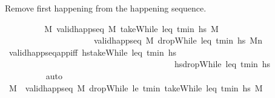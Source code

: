 \begin{isabellebody}
\begin{isamarkuptext}%
Remove first happening from the happening sequence.%
\end{isamarkuptext}\isamarkuptrue%
\ \ \ \ \ \ \isamarkupfalse%
\ \isamarkupfalse%
\ {\isachardoublequoteopen}{\isasymexists}M\ valid{\isacharunderscore}{\kern0pt}happ{\isacharunderscore}{\kern0pt}seq\ M\ {\isacharparenleft}{\kern0pt}takeWhile\ {\isacharparenleft}{\kern0pt}leq\ t\isactrlsub m\isactrlsub i\isactrlsub n{\isacharparenright}{\kern0pt}\ hs{\isacharparenright}{\kern0pt}\ M\ \isanewline
\ \ \ \ \ \ \ \ \ \ \ \ \ \ \ \ \ \ \ \ {\isasymand}\ valid{\isacharunderscore}{\kern0pt}happ{\isacharunderscore}{\kern0pt}seq\ M\ {\isacharparenleft}{\kern0pt}dropWhile\ {\isacharparenleft}{\kern0pt}leq\ t\isactrlsub m\isactrlsub i\isactrlsub n{\isacharparenright}{\kern0pt}\ hs{\isacharparenright}{\kern0pt}\ M\isactrlsub n{\isachardoublequoteclose}\isanewline
\ \ \ \ \ \ \ \ \isamarkupfalse%
\ valid{\isacharunderscore}{\kern0pt}happ{\isacharunderscore}{\kern0pt}seq{\isacharunderscore}{\kern0pt}app{\isacharunderscore}{\kern0pt}iff{\isacharbrackleft}{\kern0pt}\ hstakeWhile\ {\isacharparenleft}{\kern0pt}leq\ t\isactrlsub m\isactrlsub i\isactrlsub n{\isacharparenright}{\kern0pt}\ hs{\isachardoublequoteclose}\ \isanewline
\ \ \ \ \ \ \ \ \ \ \ \ \ \ \ \ \ \ \ \ \ \ \ \ \ \ \ \ \ \ \ \ \ \ \ \ \ \ \ \ hsdropWhile\ {\isacharparenleft}{\kern0pt}leq\ t\isactrlsub m\isactrlsub i\isactrlsub n{\isacharparenright}{\kern0pt}\ hs{\isachardoublequoteclose}{\isacharbrackright}{\kern0pt}\ \isanewline
\ \ \ \ \ \ \ \ \isamarkupfalse%
\ auto\isanewline
\ \ \ \ \ \ \isamarkupfalse%
\ \isamarkupfalse%
\ M\ \ {\isachardoublequoteopen}valid{\isacharunderscore}{\kern0pt}happ{\isacharunderscore}{\kern0pt}seq\ M\ {\isacharparenleft}{\kern0pt}dropWhile\ {\isacharparenleft}{\kern0pt}le\ t\isactrlsub m\isactrlsub i\isactrlsub n{\isacharparenright}{\kern0pt}\ {\isacharparenleft}{\kern0pt}takeWhile\ {\isacharparenleft}{\kern0pt}leq\ t\isactrlsub m\isactrlsub i\isactrlsub n{\isacharparenright}{\kern0pt}\ hs{\isacharparenright}{\kern0pt}{\isacharparenright}{\kern0pt}\ M\isanewline

\end{isabellebody}
